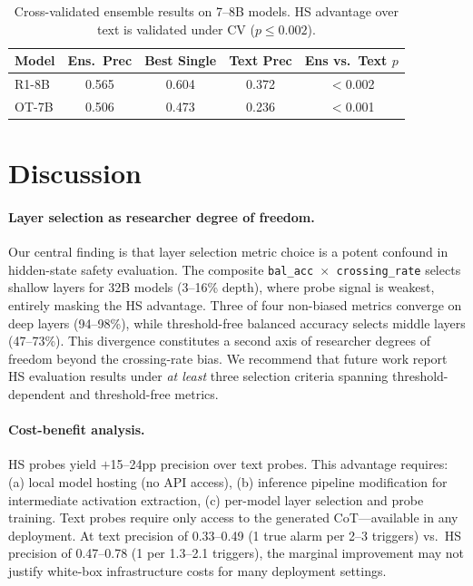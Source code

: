 \documentclass[11pt]{article}
\begin{document}
\begin{table}[t]
\centering
\small
\begin{tabular}{lcccc}
\toprule
\textbf{Model} & \textbf{Ens.\ Prec} & \textbf{Best Single} & \textbf{Text Prec} & \textbf{Ens vs.\ Text $p$} \\
\midrule
R1-8B & 0.565 & 0.604 & 0.372 & $<$0.002 \\
OT-7B & 0.506 & 0.473 & 0.236 & $<$0.001 \\
\bottomrule
\end{tabular}
\caption{Cross-validated ensemble results on 7--8B models. HS advantage over text is validated under CV ($p \leq 0.002$).}
\label{tab:ensemble}
\end{table}


\section{Discussion}
\label{sec:discussion}

\paragraph{Layer selection as researcher degree of freedom.}
Our central finding is that layer selection metric choice is a potent confound in hidden-state safety evaluation. The composite \texttt{bal\_acc $\times$ crossing\_rate} selects shallow layers for 32B models (3--16\% depth), where probe signal is weakest, entirely masking the HS advantage. Three of four non-biased metrics converge on deep layers (94--98\%), while threshold-free balanced accuracy selects middle layers (47--73\%). This divergence constitutes a second axis of researcher degrees of freedom beyond the crossing-rate bias. We recommend that future work report HS evaluation results under \emph{at least} three selection criteria spanning threshold-dependent and threshold-free metrics.

\paragraph{Cost-benefit analysis.}
HS probes yield $+$15--24pp precision over text probes. This advantage requires: (a) local model hosting (no API access), (b) inference pipeline modification for intermediate activation extraction, (c) per-model layer selection and probe training. Text probes require only access to the generated CoT---available in any deployment. At text precision of 0.33--0.49 (1 true alarm per 2--3 triggers) vs.\ HS precision of 0.47--0.78 (1 per 1.3--2.1 triggers), the marginal improvement may not justify white-box infrastructure costs for many deployment settings.
\end{document}
